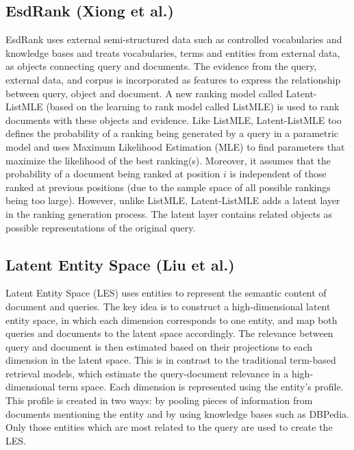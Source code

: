 \documentclass{article}
\begin{document}
\subsection{EsdRank (Xiong et al.\cite{xiong2015esdrank})}
\label{subsec:esdrank}

EsdRank uses external semi-structured data such as controlled vocabularies and knowledge bases and treats vocabularies, terms and entities from external data, as objects connecting query and documents. The evidence from the query, external data, and corpus is incorporated as features to express the relationship between query, object and document. A new ranking model called Latent-ListMLE (based on the learning to rank model called ListMLE) is used to rank documents with these objects and evidence. Like ListMLE, Latent-ListMLE too defines the probability of a ranking being generated by a query in a parametric model and uses Maximum
Likelihood Estimation (MLE) to find parameters that maximize the likelihood of the best ranking(s). Moreover, it assumes that the probability of a document being ranked at position $i$ is independent of those ranked at previous positions (due to the sample space of all possible rankings being too large). However, unlike ListMLE, Latent-ListMLE adds a latent layer in the ranking generation process. The latent layer contains related objects as possible representations of the original query. 

\subsection{Latent Entity Space (Liu et al.\cite{liu2015latent})}
\label{subsec:les}

Latent Entity Space (LES) uses entities to represent the semantic content of document and queries. The key idea is to construct a high-dimensional latent entity space, in which each dimension corresponds to one entity, and map both queries and documents to the latent space accordingly. The relevance between query and document is then estimated based on their projections to each dimension in the latent space. This is in contrast to the traditional term-based retrieval models, which estimate the query-document relevance in a high-dimensional term space. Each dimension is represented using the entity's profile. This profile is created in two ways: by pooling pieces of information from documents mentioning the entity and by using knowledge bases such as DBPedia. Only those entities which are most related to the query are used to create the LES. 
\end{document}
